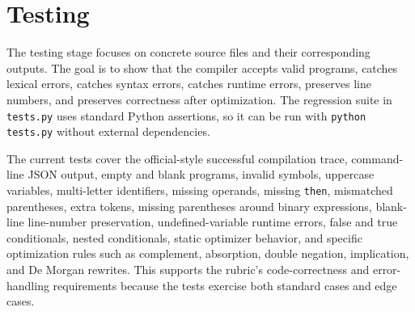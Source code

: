 \documentclass[10pt]{article}
\begin{document}
\section{Testing}
The testing stage focuses on concrete source files and their corresponding outputs. The goal is to show that the compiler accepts valid programs, catches lexical errors, catches syntax errors, catches runtime errors, preserves line numbers, and preserves correctness after optimization. The regression suite in \texttt{tests.py} uses standard Python assertions, so it can be run with \texttt{python tests.py} without external dependencies.

The current tests cover the official-style successful compilation trace, command-line JSON output, empty and blank programs, invalid symbols, uppercase variables, multi-letter identifiers, missing operands, missing \texttt{then}, mismatched parentheses, extra tokens, missing parentheses around binary expressions, blank-line line-number preservation, undefined-variable runtime errors, false and true conditionals, nested conditionals, static optimizer behavior, and specific optimization rules such as complement, absorption, double negation, implication, and De Morgan rewrites. This supports the rubric's code-correctness and error-handling requirements because the tests exercise both standard cases and edge cases.
\end{document}
